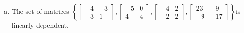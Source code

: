 \begin{exerciseAnswer}
\begin{enumerate}[(a)]
\item The set of matrices \( \left\{ \left[\begin{array}{cc}
-4 & -3 \\
-3 & 1
\end{array}\right] , \left[\begin{array}{cc}
-5 & 0 \\
4 & 4
\end{array}\right] , \left[\begin{array}{cc}
-4 & 2 \\
-2 & 2
\end{array}\right] , \left[\begin{array}{cc}
23 & -9 \\
-9 & -17
\end{array}\right] \right\} \)is linearly dependent.
\end{enumerate}
    
\end{exerciseAnswer}
    
